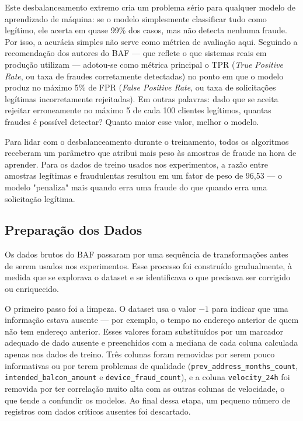 Este desbalanceamento extremo cria um problema sério para qualquer modelo de aprendizado de máquina: se o modelo simplesmente classificar tudo como legítimo, ele acerta em quase 99\% dos casos, mas não detecta nenhuma fraude. Por isso, a acurácia simples não serve como métrica de avaliação aqui. Seguindo a recomendação dos autores do BAF \cite{jesus2022baf} --- que reflete o que sistemas reais em produção utilizam --- adotou-se como métrica principal o TPR (\textit{True Positive Rate}, ou taxa de fraudes corretamente detectadas) no ponto em que o modelo produz no máximo 5\% de FPR (\textit{False Positive Rate}, ou taxa de solicitações legítimas incorretamente rejeitadas). Em outras palavras: dado que se aceita rejeitar erroneamente no máximo 5 de cada 100 clientes legítimos, quantas fraudes é possível detectar? Quanto maior esse valor, melhor o modelo.

Para lidar com o desbalanceamento durante o treinamento, todos os algoritmos receberam um parâmetro que atribui mais peso às amostras de fraude na hora de aprender. Para os dados de treino usados nos experimentos, a razão entre amostras legítimas e fraudulentas resultou em um fator de peso de 96,53 --- o modelo "penaliza" mais quando erra uma fraude do que quando erra uma solicitação legítima.

\subsection{Preparação dos Dados}

Os dados brutos do BAF passaram por uma sequência de transformações antes de serem usados nos experimentos. Esse processo foi construído gradualmente, à medida que se explorava o dataset e se identificava o que precisava ser corrigido ou enriquecido.

O primeiro passo foi a limpeza. O dataset usa o valor $-1$ para indicar que uma informação estava ausente --- por exemplo, o tempo no endereço anterior de quem não tem endereço anterior. Esses valores foram substituídos por um marcador adequado de dado ausente e preenchidos com a mediana de cada coluna calculada apenas nos dados de treino. Três colunas foram removidas por serem pouco informativas ou por terem problemas de qualidade (\texttt{prev\_address\_months\_count}, \texttt{intended\_balcon\_amount} e \texttt{device\_fraud\_count}), e a coluna \texttt{velocity\_24h} foi removida por ter correlação muito alta com as outras colunas de velocidade, o que tende a confundir os modelos. Ao final dessa etapa, um pequeno número de registros com dados críticos ausentes foi descartado.

